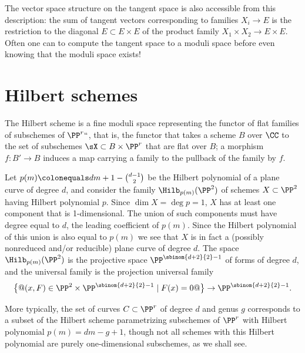 The vector space structure on the tangent space is also accessible from
this description:  the
 sum of tangent vectors corresponding to families $X_i \to E$ is the
 restriction to the diagonal
 $E \subset E\times E$
 of the product family $X_1 \times X_2 \to E\times E$.
Often one can to compute the tangent space to a moduli space before even
knowing that the moduli space exists!

\section{Hilbert schemes}
\label{hilbert scheme section}

The Hilbert scheme is a fine moduli space representing the functor of
%
%
%
flat families of subschemes of $\PP^r` `$,
that is, the functor that takes a scheme $B$ over $\CC$ to the set of
subschemes $\sX \subset B\times \PP^r$
that are flat over $B$; a morphism $f: B'\to B$ induces a map carrying
a family to the pullback of the family by $f$.

\begin{example}
\label{Hilb for plane curves}
Let $p(m) \colonequals  dm+1-\tbinom{d-1}{ 2}$ be the Hilbert polynomial of
a
plane curve
%
of degree $d$, and consider the family
$\Hilb_{p(m)}(\PP^2)$
%
of schemes $X \subset \PP^{2}$ having Hilbert polynomial $p$. Since
$\dim X = \deg p = 1$, $X$ has at least one component that is
1-dimensional. The union of such components must have degree
equal to $d$, the leading coefficient of $p(m)$. Since the Hilbert
polynomial  of this union is also equal
to $p(m)$ we see that $X$ is in fact a (possibly nonreduced and/or
reducible) plane curve of degree $d$. The space $\Hilb_{p(m)}(\PP^2)$
is the projective space $\PP^{\sbinom{d+2}{2}-1}$ of forms of degree $d$,
and the universal family is the projection
universal family
%
$$
\bigl\{@(x,F) \in \PP^2 \times \PP^{\sbinom{d+2}{2}-1} \mid F(x)=0@\bigr\} \to
\PP^{\sbinom{d+2}{2}-1}.
$$

More typically, the set of curves $C \subset \PP^r$ of degree $d$ and
genus $g$ corresponds to a subset of the Hilbert scheme parametrizing
subschemes of $\PP^r$ with Hilbert polynomial $p(m) = dm - g + 1$, though
not all schemes with this Hilbert polynomial are purely one-dimensional
subschemes, as we shall see.
\end{example}

